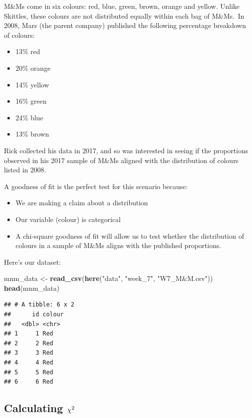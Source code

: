 \documentclass[
]{book}
\newenvironment{Shaded}{\begin{snugshade}}{\end{snugshade}}
\newcommand{\FunctionTok}[1]{\textcolor[rgb]{0.13,0.29,0.53}{\textbf{#1}}}
\newcommand{\NormalTok}[1]{#1}
\newcommand{\OtherTok}[1]{\textcolor[rgb]{0.56,0.35,0.01}{#1}}
\newcommand{\StringTok}[1]{\textcolor[rgb]{0.31,0.60,0.02}{#1}}
\providecommand{\tightlist}{%
  \setlength{\itemsep}{0pt}\setlength{\parskip}{0pt}}
\begin{document}
M\&Ms come in six colours: red, blue, green, brown, orange and yellow. Unlike Skittles, these colours are not distributed equally within each bag of M\&Ms.~In 2008, Mars (the parent company) published the following percentage breakdown of colours:

\begin{itemize}
\tightlist
\item
  13\% red
\item
  20\% orange
\item
  14\% yellow
\item
  16\% green
\item
  24\% blue
\item
  13\% brown
\end{itemize}

Rick collected his data in 2017, and so was interested in seeing if the proportions observed in his 2017 sample of M\&Ms aligned with the distribution of colours listed in 2008.

A goodness of fit is the perfect test for this scenario because:

\begin{itemize}
\tightlist
\item
  We are making a claim about a distribution
\item
  Our variable (colour) is categorical
\item
  A chi-square goodness of fit will allow us to test whether the distribution of colours in a sample of M\&Ms aligns with the published proportions.
\end{itemize}

Here's our dataset:

\begin{Shaded}
\begin{Highlighting}[]
\NormalTok{mnm\_data }\OtherTok{\textless{}{-}} \FunctionTok{read\_csv}\NormalTok{(}\FunctionTok{here}\NormalTok{(}\StringTok{"data"}\NormalTok{, }\StringTok{"week\_7"}\NormalTok{, }\StringTok{"W7\_M\&M.csv"}\NormalTok{))}
\FunctionTok{head}\NormalTok{(mnm\_data)}
\end{Highlighting}
\end{Shaded}

\begin{verbatim}
## # A tibble: 6 x 2
##      id colour
##   <dbl> <chr> 
## 1     1 Red   
## 2     2 Red   
## 3     3 Red   
## 4     4 Red   
## 5     5 Red   
## 6     6 Red
\end{verbatim}

\subsection{\texorpdfstring{Calculating \(\\\chi^2\)}{Calculating \textbackslash\textbackslash\textbackslash chi\^{}2}}\label{calculating-chi2}
\end{document}
